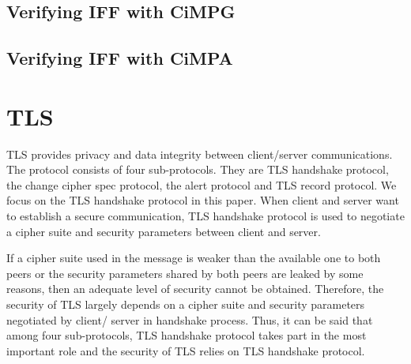 \documentclass[a4paper,fleqn]{cas-dc}
\begin{document}
\subsection{Verifying IFF with CiMPG} \label{cimpg}

\subsection{Verifying IFF with CiMPA} \label{cimpa}

\section{TLS}\label{tls}
TLS \cite{dierk} provides privacy and data integrity between client/server communications. The protocol consists of four sub-protocols. They are TLS handshake protocol, the change cipher spec protocol, the alert protocol and TLS record protocol. We focus on the TLS handshake protocol in this paper. When client and server want to establish a secure communication, TLS handshake protocol is used to negotiate a cipher suite and security parameters between client and server. 


If a cipher suite used in the message is weaker than the available one to both peers or the security parameters shared by both peers are leaked by some reasons, then an adequate level of security cannot be obtained. Therefore, the security of TLS largely depends on a cipher suite and security parameters negotiated by client/ server in handshake process. Thus, it can be said that among four sub-protocols, TLS handshake protocol takes part in the most important role and the security of TLS relies on TLS handshake protocol. 
\end{document}
